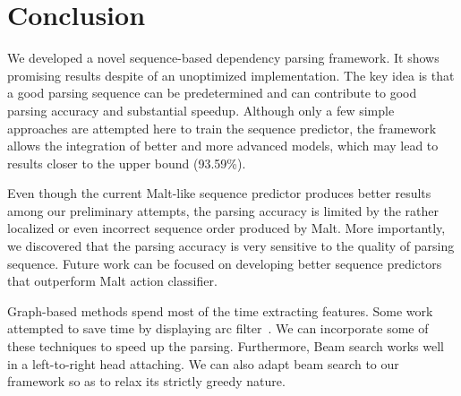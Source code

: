 \section{Conclusion}
We developed a novel sequence-based dependency parsing
framework. It shows promising results despite of an unoptimized
implementation.
The key idea is that a good parsing sequence can be predetermined
and can contribute to good parsing accuracy and substantial
speedup. Although only a few simple approaches are attempted here
to train the sequence predictor, the framework allows the integration
of better and more advanced models,
which may lead to results closer to the upper bound (93.59\%).

Even though the current Malt-like sequence predictor 
produces better results among our preliminary attempts, 
the parsing accuracy is limited by the
rather localized or even incorrect sequence order produced by Malt.
More importantly, we discovered that the parsing accuracy is very
sensitive to the quality of parsing sequence. Future work
can be focused on developing better sequence predictors that
outperform Malt action classifier.

Graph-based methods spend most of the time extracting features.
Some work attempted to save time by displaying arc
filter~\cite{bergsma2010fast,rush2012vine}. We can incorporate some of these
techniques to speed up the parsing. Furthermore, Beam search works well in a
left-to-right head attaching. We can also adapt beam search to
our framework so as to relax its strictly greedy nature.
%
%
